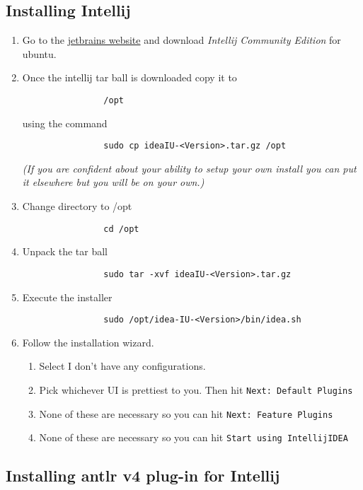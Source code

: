 \documentclass{article}
\begin{document}
	\subsection{Installing Intellij}
		\begin{enumerate}
			\item Go to the \href{https://www.jetbrains.com/idea/download/index.html} {jetbrains website} and download
			\textit{Intellij Community Edition} for ubuntu.

			\item Once the intellij tar ball is downloaded copy it to
			\begin{lstlisting}
				/opt
			\end{lstlisting}
			using the command
			\begin{lstlisting}
				sudo cp ideaIU-<Version>.tar.gz /opt
			\end{lstlisting}
			\textit{(If you are confident about your ability to setup your own install you can put it elsewhere but you
			will be on your own.)}

			\item Change directory to /opt
			\begin{lstlisting}
				cd /opt
			\end{lstlisting}
			\item Unpack the tar ball
			\begin{lstlisting}
				sudo tar -xvf ideaIU-<Version>.tar.gz
			\end{lstlisting}
			\item Execute the installer
			\begin{lstlisting}
				sudo /opt/idea-IU-<Version>/bin/idea.sh
			\end{lstlisting}
			\item Follow the installation wizard.
			\begin{enumerate}
				\item Select I don't have any configurations.
				\item Pick whichever UI is prettiest to you. Then hit \texttt{Next: Default Plugins}
				\item None of these are necessary so you can hit \texttt{Next: Feature Plugins}
				\item None of these are necessary so you can hit \texttt{Start using IntellijIDEA}
			\end{enumerate}
		\end{enumerate}


	\subsection{Installing antlr v4 plug-in for Intellij}
\end{document}
